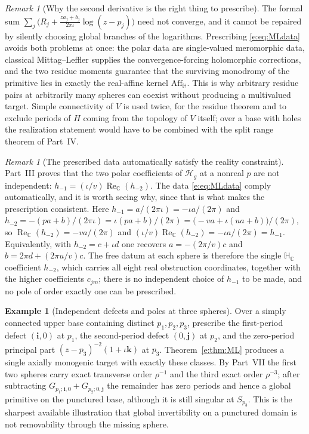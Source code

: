 \documentclass[11pt,a4paper]{article}
\numberwithin{equation}{section}
\theoremstyle{definition}
\newtheorem{example}[theorem]{Example}
\theoremstyle{remark}
\newtheorem{remark}[theorem]{Remark}
\theoremstyle{plain}
\newcommand{\HH}{\mathbb H}
\newcommand{\HC}{\mathbb H_{\mathbb C}}
\newcommand{\CC}{\mathbb C}
\DeclareMathOperator{\Rea}{Re}
\newcommand{\ReC}{\Rea_{\CC}}
\newcommand{\Aff}{\mathrm{Aff}_{\HH}}
\newcommand{\Hg}{\mathcal H_{g}}      %
\begin{document}
\begin{remark}[Why the second derivative is the right thing to prescribe]
\label{e:rem:whysecond}
The formal sum
$\sum_j\bigl(R_j+\frac{za_j+b_j}{2\pi\iota}\log(z-p_j)\bigr)$ need not
converge, and it cannot be repaired by silently choosing global branches
of the logarithms. Prescribing \eqref{e:eq:MLdata} avoids both problems
at once: the polar data are single-valued meromorphic data, classical
Mittag--Leffler supplies the convergence-forcing holomorphic
corrections, and the two residue moments guarantee that the surviving
monodromy of the primitive lies in exactly the real-affine kernel
$\Aff$. This is why arbitrary residue pairs at arbitrarily many spheres
can coexist without producing a multivalued target. Simple connectivity
of $V$ is used twice, for the residue theorem and to exclude periods of
$H$ coming from the topology of $V$ itself; over a base with holes the
realization statement would have to be combined with the split range
theorem of Part~IV.
\end{remark}

\begin{remark}[The prescribed data automatically satisfy the reality
constraint]
\label{e:rem:MLreality}
Part~III proves that the two polar coefficients of $\Hg$ at a nonreal
$p$ are not independent: $h_{-1}=(\iota/v)\ReC(h_{-2})$. The data
\eqref{e:eq:MLdata} comply automatically, and it is worth seeing why,
since that is what makes the prescription consistent. Here
$h_{-1}=a/(2\pi\iota)=-\iota a/(2\pi)$ and
$h_{-2}=-(pa+b)/(2\pi\iota)=\iota(pa+b)/(2\pi)
=\bigl(-va+\iota(ua+b)\bigr)/(2\pi)$, so
$\ReC(h_{-2})=-va/(2\pi)$ and $(\iota/v)\ReC(h_{-2})=-\iota a/(2\pi)
=h_{-1}$. Equivalently, with $h_{-2}=c+\iota d$ one recovers
$a=-(2\pi/v)c$ and $b=2\pi d+(2\pi u/v)c$. The free datum at each sphere
is therefore the single $\HC$ coefficient $h_{-2}$, which carries all
eight real obstruction coordinates, together with the higher coefficients
$c_{jm}$; there is no independent choice of $h_{-1}$ to be made, and no
pole of order exactly one can be prescribed.
\end{remark}

\begin{example}[Independent defects and poles at three spheres]
\label{e:ex:several}
Over a simply connected upper base containing distinct $p_1,p_2,p_3$,
prescribe the first-period defect $(\mathbf i,0)$ at $p_1$, the
second-period defect $(0,\mathbf j)$ at $p_2$, and the zero-period
principal part $(z-p_3)^{-2}(1+\iota\mathbf k)$ at $p_3$.
Theorem~\ref{e:thm:ML} produces a single axially monogenic target with
exactly these classes. By Part~VII the first two spheres carry exact
transverse order $\rho^{-1}$ and the third exact order $\rho^{-3}$;
after subtracting $G_{p_1;\mathbf i,0}+G_{p_2;0,\mathbf j}$ the remainder
has zero periods and hence a global primitive on the punctured base,
although it is still singular at $S_{p_3}$. This is the sharpest
available illustration that global invertibility on a punctured domain is
not removability through the missing sphere.
\end{example}
\end{document}
